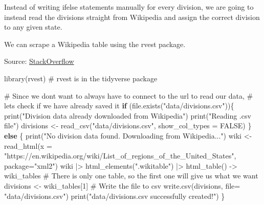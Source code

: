 \documentclass[
  letterpaper,
  DIV=11,
  numbers=noendperiod]{scrartcl}
\newenvironment{Shaded}{\begin{snugshade}}{\end{snugshade}}
\newcommand{\AttributeTok}[1]{\textcolor[rgb]{0.40,0.45,0.13}{#1}}
\newcommand{\CommentTok}[1]{\textcolor[rgb]{0.37,0.37,0.37}{#1}}
\newcommand{\ConstantTok}[1]{\textcolor[rgb]{0.56,0.35,0.01}{#1}}
\newcommand{\ControlFlowTok}[1]{\textcolor[rgb]{0.00,0.23,0.31}{\textbf{#1}}}
\newcommand{\DecValTok}[1]{\textcolor[rgb]{0.68,0.00,0.00}{#1}}
\newcommand{\FunctionTok}[1]{\textcolor[rgb]{0.28,0.35,0.67}{#1}}
\newcommand{\NormalTok}[1]{\textcolor[rgb]{0.00,0.23,0.31}{#1}}
\newcommand{\OtherTok}[1]{\textcolor[rgb]{0.00,0.23,0.31}{#1}}
\newcommand{\SpecialCharTok}[1]{\textcolor[rgb]{0.37,0.37,0.37}{#1}}
\newcommand{\StringTok}[1]{\textcolor[rgb]{0.13,0.47,0.30}{#1}}
\begin{document}
Instead of writing ifelse statements manually for every division, we are
going to instead read the divisions straight from Wikipedia and assign
the correct division to any given state.

We can scrape a Wikipedia table using the rvest package.

Source:
\href{https://stackoverflow.com/questions/73696551/r-webscraping-error-arguments-imply-differing-number-of-rows}{StackOverflow}

\begin{Shaded}
\begin{Highlighting}[]
\FunctionTok{library}\NormalTok{(rvest) }\CommentTok{\# rvest is in the tidyverse package}
\end{Highlighting}
\end{Shaded}

\begin{Shaded}
\begin{Highlighting}[]
\CommentTok{\# Since we don\textquotesingle{}t want to always have to connect to the url to read our data, }
\CommentTok{\# let\textquotesingle{}s check if we have already saved it}
\ControlFlowTok{if}\NormalTok{ (}\FunctionTok{file.exists}\NormalTok{(}\StringTok{"data/divisions.csv"}\NormalTok{))\{}
  \FunctionTok{print}\NormalTok{(}\StringTok{"Division data already downloaded from Wikipedia"}\NormalTok{)}
  \FunctionTok{print}\NormalTok{(}\StringTok{"Reading .csv file"}\NormalTok{)}
\NormalTok{  divisions }\OtherTok{\textless{}{-}} \FunctionTok{read\_csv}\NormalTok{(}\StringTok{"data/divisions.csv"}\NormalTok{, }\AttributeTok{show\_col\_types =} \ConstantTok{FALSE}\NormalTok{)}
\NormalTok{\} }\ControlFlowTok{else}\NormalTok{ \{}
  \FunctionTok{print}\NormalTok{(}\StringTok{"No division data found. Downloading from Wikipedia..."}\NormalTok{)}
\NormalTok{  wiki }\OtherTok{\textless{}{-}} \FunctionTok{read\_html}\NormalTok{(}\AttributeTok{x =}
\StringTok{"https://en.wikipedia.org/wiki/List\_of\_regions\_of\_the\_United\_States"}\NormalTok{,}
\AttributeTok{package=}\StringTok{"xml2"}\NormalTok{)}
\NormalTok{  wiki }\SpecialCharTok{|\textgreater{}} \FunctionTok{html\_elements}\NormalTok{(}\StringTok{".wikitable"}\NormalTok{) }\SpecialCharTok{|\textgreater{}} \FunctionTok{html\_table}\NormalTok{() }\OtherTok{{-}\textgreater{}}\NormalTok{ wiki\_tables}
  \CommentTok{\# There is only one table, so the first one will give us what we want}
\NormalTok{  divisions }\OtherTok{\textless{}{-}}\NormalTok{ wiki\_tables[}\DecValTok{1}\NormalTok{]}
  \CommentTok{\# Write the file to csv}
  \FunctionTok{write.csv}\NormalTok{(divisions, }\AttributeTok{file=} \StringTok{"data/divisions.csv"}\NormalTok{)}
  \FunctionTok{print}\NormalTok{(}\StringTok{"data/divisions.csv successfully created!"}\NormalTok{)}
\NormalTok{\}}
\end{Highlighting}
\end{Shaded}
\end{document}
